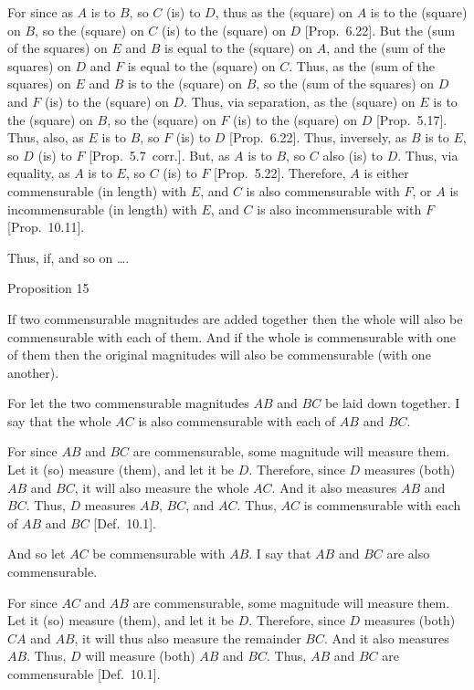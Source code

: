 For since as $A$ is to $B$, so $C$ (is) to $D$, thus as the (square) on $A$
is to the (square) on $B$, so the (square) on $C$  (is) to the (square) on $D$
[Prop.~6.22]. But the (sum of the squares) on $E$ and $B$ is equal to the (square) on $A$, and the (sum of the squares) on 
$D$ and $F$ is equal to the (square) on $C$.
Thus, as the (sum of the squares) on $E$ and $B$ is to the (square) on
$B$, so the (sum of the squares) on $D$ and $F$ (is) to the (square)
on $D$.
 Thus, via separation, as the (square) on $E$ is to the (square) on $B$, so the (square) on $F$ (is) to the (square)
on $D$ [Prop.~5.17]. Thus, also, as $E$ is to $B$,
so $F$ (is) to $D$ [Prop.~6.22]. 
 Thus, inversely,  as $B$ is to $E$, so $D$ (is) to $F$ [Prop.~5.7~corr.]. But, as $A$ is to $B$, so 
 $C$ also (is) to $D$. Thus, via equality, as $A$ is to $E$, so $C$ (is) to $F$
 [Prop.~5.22]. Therefore, $A$ is either commensurable (in length)
 with $E$, and $C$ is also commensurable with $F$, or $A$ is
 incommensurable (in length) with $E$, and $C$ is also incommensurable with $F$ [Prop.~10.11].
 
 Thus, if, and so on \ldots.


\begin{center}
{\large Proposition 15}
\end{center}

If two commensurable magnitudes are
added together then the whole will also be commensurable
with each of them. And if the whole is commensurable with one of
them then the original magnitudes will also be commensurable (with one another).

For let the two commensurable magnitudes $AB$ and $BC$ be laid
down together. I say that the whole $AC$ is also commensurable with
each of $AB$ and $BC$.

\epsfysize=0.6in
\centerline{}

For since $AB$ and $BC$ are commensurable, some  magnitude will
measure them. Let it (so) measure (them), and let it be $D$. Therefore,
since $D$ measures (both) $AB$ and $BC$, it will also measure the
whole $AC$. And it also measures $AB$ and $BC$. Thus, $D$
measures  $AB$, $BC$, and $AC$. Thus, $AC$ is commensurable
with each of $AB$ and $BC$ [Def.~10.1].

And so let $AC$ be commensurable with $AB$. I say that $AB$ and
$BC$ are also commensurable.

For since $AC$ and $AB$ are commensurable, some  magnitude
will measure them. Let it (so) measure (them), and let it be $D$. Therefore,
since $D$ measures (both) $CA$ and $AB$, it will thus also
measure the remainder $BC$. And it also measures $AB$. Thus, $D$ will
measure (both) $AB$ and $BC$. Thus, $AB$ and $BC$ are commensurable [Def.~10.1].

